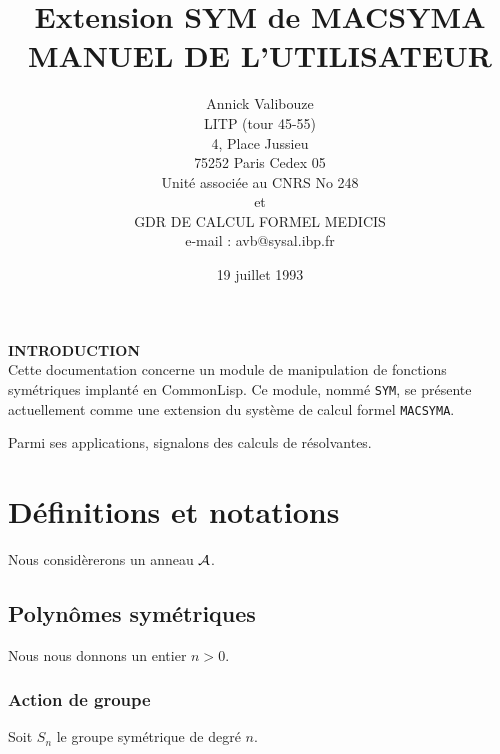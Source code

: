  \setlength{\textheight}{9.4in}
\setlength{\textwidth}{6.75in}
\setlength{\hoffset}{-1.8cm}
\setlength{\voffset}{-2cm}
\title{Extension SYM de MACSYMA\\
MANUEL DE L'UTILISATEUR}
\author{Annick Valibouze\\
LITP (tour 45-55)\\
4, Place Jussieu\\
75252 Paris Cedex 05\\
Unit\'e associ\'ee au CNRS No 248\\
et\\
GDR DE CALCUL FORMEL MEDICIS\\
\small{e-mail : avb@sysal.ibp.fr}}
\date{19 juillet 1993}
\maketitle
{}
\newcommand{\indexentry}[2]{{\tt #1} & #2\\}



\newpage
\noindent
{\bf INTRODUCTION}\\
Cette documentation concerne un module de manipulation de fonctions
sym\'etriques implant\'e en CommonLisp. Ce module, nomm\'e {\tt SYM},
se pr\'esente actuellement comme une extension du syst\`eme de calcul 
formel {\tt MACSYMA}. 

Parmi ses applications, signalons des calculs de r\'esolvantes.

\section{D\'{e}finitions et notations}
Nous consid\`ererons un anneau $\cal A$.
\subsection{Polyn\^omes sym\'etriques}
Nous nous donnons un entier $n > 0$.
\subsubsection*{Action de groupe}
Soit $S_n$ le groupe sym\'etrique de degr\'e $n$.

